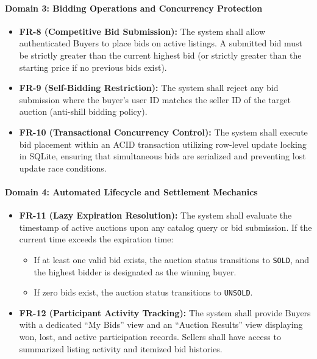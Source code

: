 \paragraph{Domain 3: Bidding Operations and Concurrency Protection}
\begin{itemize}
    \item \textbf{FR-8 (Competitive Bid Submission):} The system shall allow authenticated Buyers to place bids on active listings. A submitted bid must be strictly greater than the current highest bid (or strictly greater than the starting price if no previous bids exist).
    \item \textbf{FR-9 (Self-Bidding Restriction):} The system shall reject any bid submission where the buyer's user ID matches the seller ID of the target auction (anti-shill bidding policy).
    \item \textbf{FR-10 (Transactional Concurrency Control):} The system shall execute bid placement within an ACID transaction utilizing row-level update locking in SQLite, ensuring that simultaneous bids are serialized and preventing lost update race conditions.
\end{itemize}

\paragraph{Domain 4: Automated Lifecycle and Settlement Mechanics}
\begin{itemize}
    \item \textbf{FR-11 (Lazy Expiration Resolution):} The system shall evaluate the timestamp of active auctions upon any catalog query or bid submission. If the current time exceeds the expiration time:
    \begin{itemize}
        \item If at least one valid bid exists, the auction status transitions to \texttt{SOLD}, and the highest bidder is designated as the winning buyer.
        \item If zero bids exist, the auction status transitions to \texttt{UNSOLD}.
    \end{itemize}
    \item \textbf{FR-12 (Participant Activity Tracking):} The system shall provide Buyers with a dedicated ``My Bids'' view and an ``Auction Results'' view displaying won, lost, and active participation records. Sellers shall have access to summarized listing activity and itemized bid histories.
\end{itemize}

